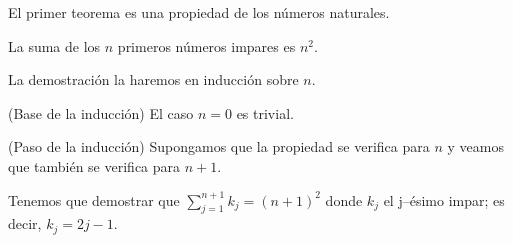 %
\begin{isabellebody}%
%
%
\isadelimtheory
\isanewline
%
\endisadelimtheory
%
\isatagtheory
%
\endisatagtheory
{\isafoldtheory}%
%
\isadelimtheory
%
\endisadelimtheory
%
\isadelimdocument
%
\endisadelimdocument
%
\isatagdocument
%
\isamarkuptrue%
%
\endisatagdocument
{\isafolddocument}%
%
\isadelimdocument
%
\endisadelimdocument
%
\begin{isamarkuptext}%
El primer teorema es una propiedad de los números naturales.

  \begin{teorema}
    La suma de los $n$ primeros números impares es $n^2$.
  \end{teorema}

  \begin{demostracion}
    La demostración la haremos en inducción sobre $n$.
    
    (Base de la inducción) El caso $n = 0$ es trivial.
    
    (Paso de la inducción) Supongamos que la propiedad se verifica para
    $n$ y veamos que también se verifica para $n+1$. 
 
    Tenemos que demostrar que $\sum_{j=1}^{n+1} k_j = (n+1)^2$ donde
    $k_j$ el j--ésimo impar; es decir, $k_j = 2j - 1$.


\end{demostracion}
\end{isamarkuptext}
\end{isabellebody}
